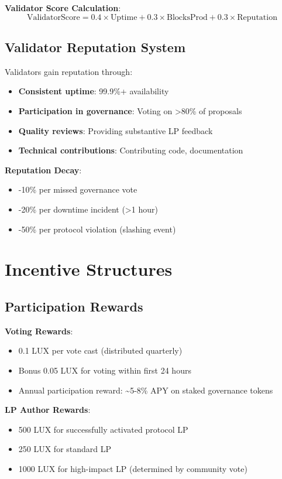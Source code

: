 \documentclass[11pt,a4paper]{article}
\begin{document}
\textbf{Validator Score Calculation}:
\begin{equation}
\text{ValidatorScore} = 0.4 \times \text{Uptime} + 0.3 \times \text{BlocksProd} + 0.3 \times \text{Reputation}
\end{equation}

\subsection{Validator Reputation System}

Validators gain reputation through:
\begin{itemize}
\item \textbf{Consistent uptime}: 99.9\%+ availability
\item \textbf{Participation in governance}: Voting on >80\% of proposals
\item \textbf{Quality reviews}: Providing substantive LP feedback
\item \textbf{Technical contributions}: Contributing code, documentation
\end{itemize}

\textbf{Reputation Decay}:
\begin{itemize}
\item -10\% per missed governance vote
\item -20\% per downtime incident (>1 hour)
\item -50\% per protocol violation (slashing event)
\end{itemize}

\section{Incentive Structures}

\subsection{Participation Rewards}

\textbf{Voting Rewards}:
\begin{itemize}
\item 0.1 LUX per vote cast (distributed quarterly)
\item Bonus 0.05 LUX for voting within first 24 hours
\item Annual participation reward: \~{}5-8\% APY on staked governance tokens
\end{itemize}

\textbf{LP Author Rewards}:
\begin{itemize}
\item 500 LUX for successfully activated protocol LP
\item 250 LUX for standard LP
\item 1000 LUX for high-impact LP (determined by community vote)
\end{itemize}
\end{document}
